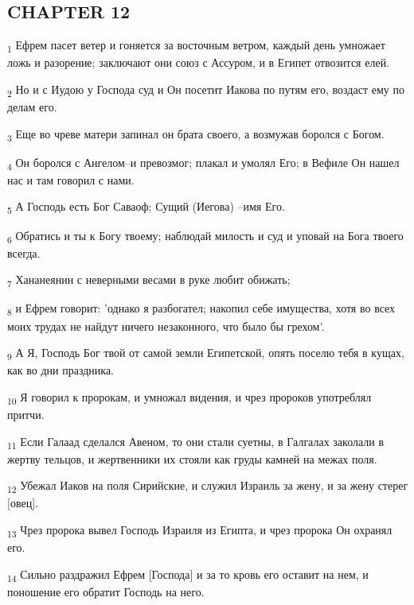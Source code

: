 \subsection{CHAPTER 12}
\begin{tcolorbox}
\textsubscript{1} Ефрем пасет ветер и гоняется за восточным ветром, каждый день умножает ложь и разорение; заключают они союз с Ассуром, и в Египет отвозится елей.
\end{tcolorbox}
\begin{tcolorbox}
\textsubscript{2} Но и с Иудою у Господа суд и Он посетит Иакова по путям его, воздаст ему по делам его.
\end{tcolorbox}
\begin{tcolorbox}
\textsubscript{3} Еще во чреве матери запинал он брата своего, а возмужав боролся с Богом.
\end{tcolorbox}
\begin{tcolorbox}
\textsubscript{4} Он боролся с Ангелом--и превозмог; плакал и умолял Его; в Вефиле Он нашел нас и там говорил с нами.
\end{tcolorbox}
\begin{tcolorbox}
\textsubscript{5} А Господь есть Бог Саваоф; Сущий (Иегова) --имя Его.
\end{tcolorbox}
\begin{tcolorbox}
\textsubscript{6} Обратись и ты к Богу твоему; наблюдай милость и суд и уповай на Бога твоего всегда.
\end{tcolorbox}
\begin{tcolorbox}
\textsubscript{7} Хананеянин с неверными весами в руке любит обижать;
\end{tcolorbox}
\begin{tcolorbox}
\textsubscript{8} и Ефрем говорит: 'однако я разбогател; накопил себе имущества, хотя во всех моих трудах не найдут ничего незаконного, что было бы грехом'.
\end{tcolorbox}
\begin{tcolorbox}
\textsubscript{9} А Я, Господь Бог твой от самой земли Египетской, опять поселю тебя в кущах, как во дни праздника.
\end{tcolorbox}
\begin{tcolorbox}
\textsubscript{10} Я говорил к пророкам, и умножал видения, и чрез пророков употреблял притчи.
\end{tcolorbox}
\begin{tcolorbox}
\textsubscript{11} Если Галаад сделался Авеном, то они стали суетны, в Галгалах заколали в жертву тельцов, и жертвенники их стояли как груды камней на межах поля.
\end{tcolorbox}
\begin{tcolorbox}
\textsubscript{12} Убежал Иаков на поля Сирийские, и служил Израиль за жену, и за жену стерег [овец].
\end{tcolorbox}
\begin{tcolorbox}
\textsubscript{13} Чрез пророка вывел Господь Израиля из Египта, и чрез пророка Он охранял его.
\end{tcolorbox}
\begin{tcolorbox}
\textsubscript{14} Сильно раздражил Ефрем [Господа] и за то кровь его оставит на нем, и поношение его обратит Господь на него.
\end{tcolorbox}
